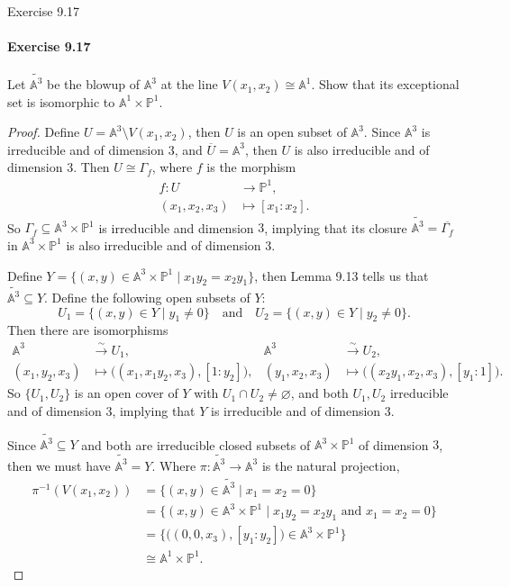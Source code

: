 \documentclass[12pt]{article}
\newenvironment{fullbox}{\begin{lrbox}{\savefullbox}\begin{minipage}{\dimexpr\textwidth-2\fboxsep\relax}}{\end{minipage}\end{lrbox}\begin{center}\framebox[\textwidth]{\usebox{\savefullbox}}\end{center}}
\newenvironment{pbox}[1][]{\begin{fullbox}\ifx#1\empty\else\paragraph{#1}\fi}{\end{fullbox}}
\theoremstyle{definition}
\newcommand{\isp}[1]{\quad\text{#1}\quad}
\renewcommand{\emptyset}{\varnothing}
\newcommand{\<}{\langle}
\renewcommand{\>}{\rangle}
\newcommand{\isom}{\cong}
\newcommand{\clo}{\overline}
\newcommand{\A}{\mathbb{A}}
\renewcommand{\P}{\mathbb{P}}
\newcommand{\blow}{\widetilde}
\newcommand{\belt}[2]{\big((#1), [#2]\big)}
\begin{document}
\thispagestyle{title}


\begin{pbox}[Exercise 9.17]
    Let $\blow{\A^3}$ be the blowup of $\A^3$ at the line $V(x_1, x_2) \isom \A^1$. Show that its exceptional set is isomorphic to $\A^1 \times \P^1$.
\end{pbox}

\begin{proof}
    Define $U = \A^3 \setminus V(x_1, x_2)$, then $U$ is an open subset of $\A^3$. Since $\A^3$ is irreducible and of dimension $3$, and $\clo{U} = \A^3$, then $U$ is also irreducible and of dimension $3$. Then $U \isom \Gamma_f$, where $f$ is the morphism
    \begin{align*}
        f : U &\to \P^1, \\
            (x_1, x_2, x_3) &\mapsto [x_1 : x_2].
    \end{align*}
    So $\Gamma_f \subseteq \A^3 \times \P^1$ is irreducible and dimension $3$, implying that its closure $\blow{\A^3} = \clo{\Gamma_f}$ in $\A^3 \times \P^1$ is also irreducible and of dimension $3$.

    Define $Y = \{(x, y) \in \A^3 \times \P^1 \mid x_1y_2 = x_2y_1\}$, then Lemma 9.13 tells us that $\blow{\A^3} \subseteq Y$. Define the following open subsets of $Y$:
    \[
        U_1 = \{(x, y) \in Y \mid y_1 \ne 0\}
        \isp{and}
        U_2 = \{(x, y) \in Y \mid y_2 \ne 0\}.
    \]
    Then there are isomorphisms
    \begin{align*}
        \A^3 &\xrightarrow{\sim} U_1, 
            & \A^3 &\xrightarrow{\sim} U_2, \\
        (x_1, y_2, x_3) &\mapsto \belt{x_1, x_1y_2, x_3}{1 : y_2},
            & (y_1, x_2, x_3) &\mapsto \belt{x_2y_1, x_2, x_3}{y_1 : 1}.
    \end{align*}
    So $\{U_1, U_2\}$ is an open cover of $Y$ with $U_1 \cap U_2 \ne \emptyset$, and both $U_1, U_2$ irreducible and of dimension $3$, implying that $Y$ is irreducible and of dimension $3$.

    Since $\blow{\A^3} \subseteq Y$ and both are irreducible closed subsets of $\A^3 \times \P^1$ of dimension $3$, then we must have $\blow{\A^3} = Y$. Where $\pi : \blow{\A^3} \to \A^3$ is the natural projection,
    \begin{align*}
        \pi^{-1}(V(x_1, x_2))
            &= \{(x, y) \in \blow{\A^3} \mid x_1 = x_2 = 0\} \\
            &= \{(x, y) \in \A^3 \times \P^1 \mid x_1y_2 = x_2y_1 \text{ and } x_1 = x_2 = 0\} \\
            &= \{\belt{0, 0, x_3}{y_1 : y_2} \in \A^3 \times \P^1\} \\
            &\isom \A^1 \times \P^1.
    \end{align*}

\end{proof}
\end{document}
